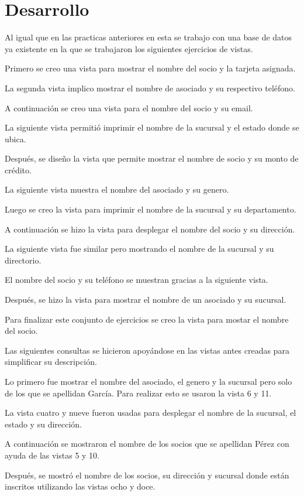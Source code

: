 \documentclass[12pt, titlepage]{article}
\begin{document}
	\section{Desarrollo}
	Al igual que en las practicas anteriores en esta se trabajo con una base de datos ya existente en la que se trabajaron los siguientes ejercicios de vistas.
	
	Primero se creo una vista para mostrar el nombre del socio y la tarjeta asignada.
	
	La segunda vista implico mostrar el nombre de asociado y su respectivo teléfono.
	
	A continuación se creo una vista para el nombre del socio y su email.
	
	La siguiente vista permitió imprimir el nombre de la sucursal y el estado donde se ubica.
	
	Después, se diseño la vista que permite mostrar el nombre de socio y su monto de crédito.
	
	La siguiente vista muestra el nombre del asociado y su genero.
	
	Luego se creo la vista para imprimir el nombre de la sucursal y su departamento.
	
	A continuación se hizo la vista para desplegar el nombre del socio y su dirección.
	
	La siguiente vista fue similar pero mostrando el nombre de la sucursal y su directorio.
	
	El nombre del socio y su teléfono se muestran gracias a la siguiente vista.
	
	Después, se hizo la vista para mostrar el nombre de un asociado y su sucursal.
	
	Para finalizar este conjunto de ejercicios se creo la vista para mostar el nombre del socio.
	
	Las siguientes consultas se hicieron apoyándose en las vistas antes creadas para simplificar su descripción.
	
	Lo primero fue mostrar el nombre del asociado, el genero y la sucursal pero solo de los que se apellidan García. Para realizar esto se usaron la vista 6  y 11.
	
	La vista cuatro y nueve fueron usadas para desplegar el nombre de la sucursal, el estado y su dirección.
	
	A continuación se mostraron el nombre de los socios que se apellidan Pérez con ayuda de las vistas 5 y 10.
	 
	Después, se mostró el nombre de los socios, su dirección y sucursal donde están inscritos utilizando las vistas ocho y doce.
	
\end{document}
